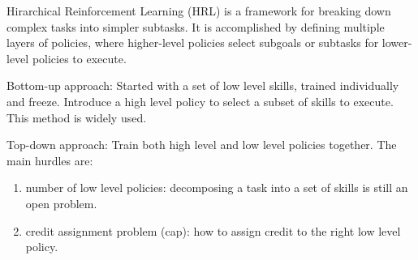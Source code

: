 Hirarchical Reinforcement Learning (HRL) is a framework for breaking down complex tasks into simpler subtasks. It is accomplished by defining multiple layers of policies, where higher-level policies select subgoals or subtasks for lower-level policies to execute. 

Bottom-up approach: Started with a set of low level skills, trained individually and freeze. Introduce a high level policy to select a subset of skills to execute. This method is widely used.

Top-down approach: Train both high level and low level policies together. The main hurdles are: 
\begin{enumerate}
    \item number of low level policies: decomposing a task into a set of skills is still an open problem.
    \item credit assignment problem (cap): how to assign credit to the right low level policy.
\end{enumerate}


